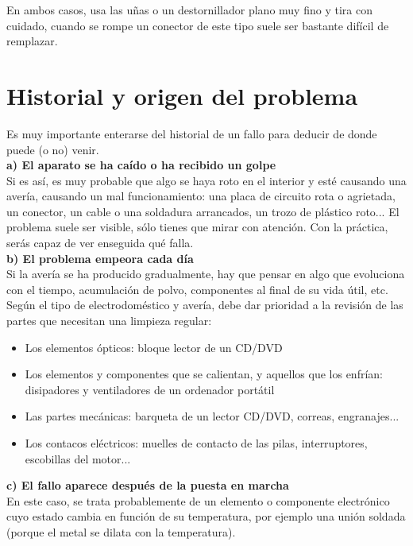 En ambos casos, usa las uñas o un destornillador plano muy fino y tira con cuidado, cuando se rompe un conector de este tipo suele ser bastante difícil de remplazar.
\newpage

\section{Historial y origen del problema}

Es muy importante enterarse del historial de un fallo para deducir de donde puede (o no) venir.\\

{\large \textbf{a) El aparato se ha caído o ha recibido un golpe}}\\

Si es así, es muy probable que algo se haya roto en el interior y esté causando una avería,
causando un mal funcionamiento: una placa de circuito rota o agrietada, un conector, un cable o una soldadura arrancados, un trozo de plástico roto...
El problema suele ser visible, sólo tienes que mirar con atención.
Con la práctica, serás capaz de ver enseguida qué falla.\\

{\large \textbf{b) El problema empeora cada día}}\\

Si la avería se ha producido gradualmente, hay que pensar en algo que evoluciona con el tiempo, acumulación de polvo, componentes al final de su vida útil, etc.
Según el tipo de electrodoméstico y avería, debe dar prioridad a la revisión de las partes que necesitan una limpieza regular:

\begin{itemize}

\item Los elementos ópticos: bloque lector de un CD/DVD
\item Los elementos y componentes que se calientan, y aquellos que los enfrían: disipadores y ventiladores de un ordenador portátil
\item Las partes mecánicas: barqueta de un lector CD/DVD, correas, engranajes...
\item Los contacos eléctricos: muelles de contacto de las pilas, interruptores, escobillas del motor...
\end{itemize}

{\large \textbf{c) El fallo aparece después de la puesta en marcha}}\\

En este caso, se trata probablemente de un elemento o componente electrónico cuyo estado cambia en función de su temperatura, por ejemplo
una unión soldada (porque el metal se dilata con la temperatura).

